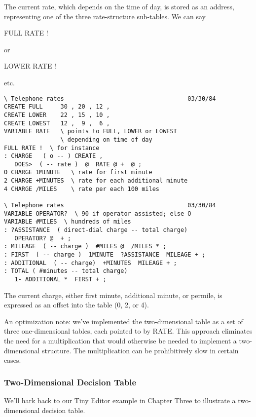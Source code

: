 The current rate, which depends on the time of day, is stored as an
address, representing one of the three rate-structure sub-tables. We can
say
\begin{Code}
FULL RATE !
\end{Code}
or
\begin{Code}
LOWER RATE !
\end{Code}
etc.

\begin{figure*}[tttt]
\begin{center}
\begin{BVerbatim}
\ Telephone rates                                   03/30/84
CREATE FULL     30 , 20 , 12 ,
CREATE LOWER    22 , 15 , 10 ,
CREATE LOWEST   12 ,  9 ,  6 ,
VARIABLE RATE   \ points to FULL, LOWER or LOWEST
                \ depending on time of day
FULL RATE !  \ for instance
: CHARGE   ( o -- ) CREATE ,
   DOES>  ( -- rate )  @  RATE @ +  @ ;
O CHARGE 1MINUTE   \ rate for first minute
2 CHARGE +MINUTES  \ rate for each additional minute
4 CHARGE /MILES    \ rate per each 100 miles

\ Telephone rates                                   03/30/84
VARIABLE OPERATOR?  \ 90 if operator assisted; else O
VARIABLE #MILES  \ hundreds of miles
: ?ASSISTANCE  ( direct-dial charge -- total charge)
   OPERATOR? @  + ;
: MILEAGE  ( -- charge )  #MILES @  /MILES * ;
: FIRST  ( -- charge )  1MINUTE  ?ASSISTANCE  MILEAGE + ;
: ADDITIONAL  ( -- charge)  +MINUTES  MILEAGE + ;
: TOTAL ( #minutes -- total charge)
   1- ADDITIONAL *  FIRST + ;
\end{BVerbatim}
\end{center}
\end{figure*}
The current charge, either first minute, additional minute, or permile,
is expressed as an offset into the table (0, 2, or 4).

An optimization note: we've implemented the two-dimensional table
as a set of three one-dimensional tables, each pointed to by RATE. This
approach eliminates the need for a multiplication that would otherwise be
needed to implement a two-dimensional structure. The multiplication can
be prohibitively slow in certain cases.

\subsubsection{Two-Dimensional Decision Table}

We'll hark back to our Tiny Editor example in Chapter Three to illustrate
a two-dimensional decision table.

